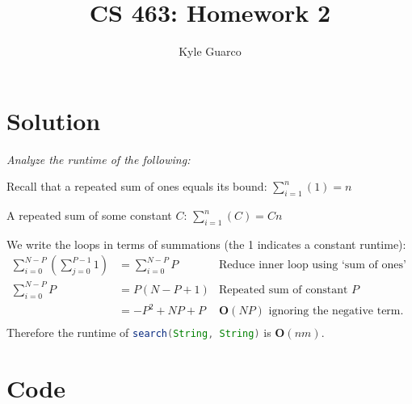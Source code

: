 \documentclass{article}
\author{Kyle Guarco}
\title{CS 463: Homework 2}
\begin{document}
\maketitle
\section{Solution}
\textit{Analyze the runtime of the following:}


\begin{tcolorbox}
	\centering
	Recall that a repeated sum of ones equals its bound: $\sum_{i = 1}^{n}(1) = n$

	A repeated sum of some constant $C$: $\sum_{i = 1}^{n}(C) = Cn$
\end{tcolorbox}

\noindent We write the loops in terms of summations (the 1 indicates a constant runtime):
\begin{align*}
	\sum_{i = 0}^{N - P}\left( \sum_{j = 0}^{P - 1}{1} \right) &= \sum_{i = 0}^{N - P}{P}  &\mbox{Reduce inner loop using `sum of ones' formula}\\
	\sum_{i = 0}^{N - P}{P} &= P(N - P + 1) &\mbox{Repeated sum of constant $P$}\\
	&= -P^2 + NP + P &\mbox{$\mathbf{O}(NP)$ ignoring the negative term.}\\
\end{align*}
Therefore the runtime of \lstinline[language=Java]{search(String, String)} is $\mathbf{O}(nm)$.

\newpage
\section{Code}

\end{document}
